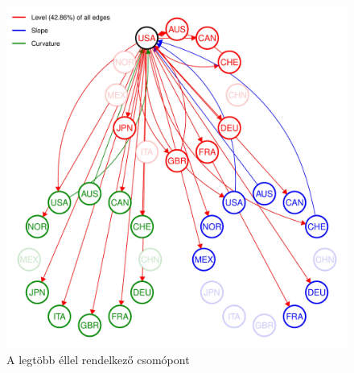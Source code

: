 \documentclass[12pt,bibliography=totoc]{article}
\begin{document}

\begin{figure}[H]
\caption{A legtöbb éllel rendelkező csomópont}
\includegraphics[width=11.5cm]{USA_B_1_plot_2004-07-01_2019-12-31_0.01-page-001}
\centering
\end{figure}


\newpage







\end{document}

